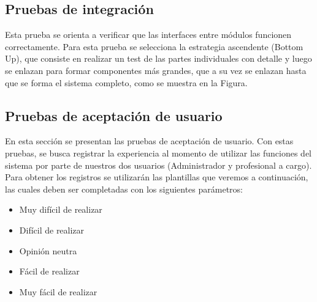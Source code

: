  \clearpage
 \newpage

\subsection{Pruebas de integración}

Esta prueba se orienta a verificar que las interfaces entre módulos funcionen correctamente. Para esta prueba se selecciona la estrategia ascendente (Bottom Up), que consiste en realizar un test de las partes individuales con detalle y luego se enlazan para formar componentes más grandes, que a su vez se enlazan hasta que se forma el sistema completo, como se muestra en la Figura.
\subsection{Pruebas de aceptación de usuario}
En esta sección se presentan las pruebas de aceptación de usuario. Con estas pruebas, se busca registrar la experiencia al momento de utilizar las funciones del sistema por parte de nuestros dos usuarios (Administrador y profesional a cargo). Para obtener los registros se utilizarán las plantillas que veremos a continuación, las cuales deben ser completadas con los siguientes parámetros:
\begin{itemize}
	\item Muy difícil de realizar
	\item Difícil de realizar
	\item Opinión neutra
	\item Fácil de realizar
	\item Muy fácil de realizar
\end{itemize}

